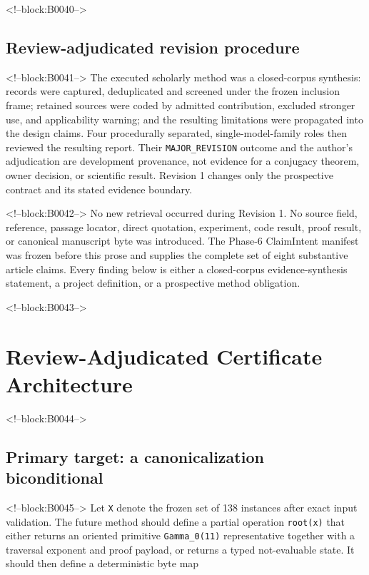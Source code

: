 \documentclass[11pt]{article}
\begin{document}
<!--block:B0040-->
\hypertarget{32-review-adjudicated-revision-procedure}{%
\subsection{Review-adjudicated revision
procedure}\label{32-review-adjudicated-revision-procedure}}

<!--block:B0041-->
The executed scholarly method was a closed-corpus synthesis: records were
captured, deduplicated and screened under the frozen inclusion frame; retained
sources were coded by admitted contribution, excluded stronger use, and
applicability warning; and the resulting limitations were propagated into the
design claims. Four procedurally separated, single-model-family roles then
reviewed the resulting report. Their \texttt{MAJOR\_REVISION} outcome and the
author's adjudication are development provenance, not evidence for a conjugacy
theorem, owner decision, or scientific result. Revision 1 changes only the
prospective contract and its stated evidence boundary.

<!--block:B0042-->
No new retrieval occurred during Revision 1. No source field, reference,
passage locator, direct quotation, experiment, code result, proof
result, or canonical manuscript byte was introduced. The Phase-6
ClaimIntent manifest was frozen before this prose and supplies the
complete set of eight substantive article claims. Every finding below is
either a closed-corpus evidence-synthesis statement, a project
definition, or a prospective method obligation.

<!--block:B0043-->
\hypertarget{4-review-adjudicated-certificate-architecture}{%
\section{Review-Adjudicated Certificate
Architecture}\label{4-review-adjudicated-certificate-architecture}}

<!--block:B0044-->
\hypertarget{41-primary-target-a-canonicalization-biconditional}{%
\subsection{Primary target: a canonicalization
biconditional}\label{41-primary-target-a-canonicalization-biconditional}}

<!--block:B0045-->
Let \texttt{X} denote the frozen set of 138 instances after exact input
validation. The future method should define a partial operation
\texttt{root(x)} that either returns an oriented primitive
\texttt{Gamma\_0(11)} representative together with a traversal exponent
and proof payload, or returns a typed not-evaluable state. It should
then define a deterministic byte map
\end{document}
